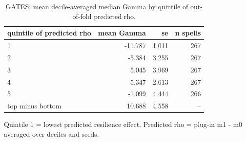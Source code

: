 \begin{table}[htbp]
\centering
\caption{GATES: mean decile-averaged median Gamma by quintile of out-of-fold predicted rho.}
\label{tab:gates}
\begin{tabular}{lrrr}
\toprule
quintile of predicted rho & mean Gamma & se & n spells \\
\midrule
1 & -11.787 & 1.011 & 267 \\
2 & -5.384 & 3.255 & 267 \\
3 & 5.045 & 3.969 & 267 \\
4 & 5.347 & 2.613 & 267 \\
5 & -1.099 & 4.444 & 266 \\
top minus bottom & 10.688 & 4.558 & -- \\
\bottomrule
\end{tabular}
\par\smallskip\footnotesize Quintile 1 = lowest predicted resilience effect. Predicted rho = plug-in m1 - m0 averaged over deciles and seeds.
\end{table}
